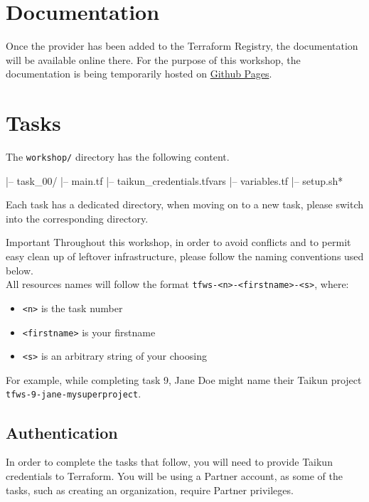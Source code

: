 \section{Documentation}
Once the provider has been added to the Terraform Registry, the documentation will be available online there.
For the purpose of this workshop, the documentation is being temporarily hosted on \href{https://intuinewin.github.io/taikun-docs/}{Github Pages}.

\section{Tasks}

The \texttt{workshop/} directory has the following content.
\begin{raw}
|-- task_00/
    |-- main.tf
    |-- taikun_credentials.tfvars
    |-- variables.tf
|-- setup.sh*
\end{raw}
Each task has a dedicated directory, when moving on to a new task, please switch into the corresponding directory.

\begin{warn}{Important}
  Throughout this workshop, in order to avoid conflicts and
  to permit easy clean up of leftover infrastructure, please follow the naming conventions used below.\\

  All resources names will follow the format \texttt{tfws-<n>-<firstname>-<s>}, where:
  \begin{itemize}
    \item \texttt{<n>} is the task number
    \item \texttt{<firstname>} is your firstname
    \item \texttt{<s>} is an arbitrary string of your choosing
  \end{itemize}
  For example, while completing task 9, Jane Doe might name their Taikun project
  \texttt{tfws-9-jane-mysuperproject}.
\end{warn}

\subsection{Authentication}
In order to complete the tasks that follow, you will need to provide Taikun credentials to Terraform.
You will be using a Partner account, as some of the tasks, such as creating an organization,
require Partner privileges.\\

